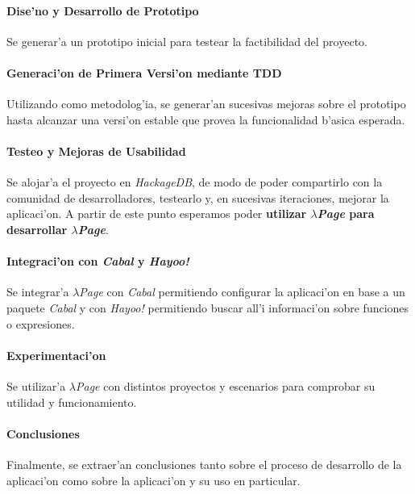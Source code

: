 \documentclass[a4paper]{article}
\begin{document}
\paragraph{Dise'no y Desarrollo de Prototipo} Se generar'a un prototipo inicial para testear la factibilidad del proyecto.
\paragraph{Generaci'on de Primera Versi'on mediante TDD} Utilizando  como metodolog'ia, se generar'an sucesivas mejoras sobre el prototipo hasta alcanzar una versi'on estable que provea la funcionalidad b'asica esperada.
\paragraph{Testeo y Mejoras de Usabilidad} Se alojar'a el proyecto en \textsl{HackageDB}, de modo de poder compartirlo con la comunidad de desarrolladores, testearlo y, en sucesivas iteraciones, mejorar la aplicaci'on.  A partir de este punto esperamos poder \textbf{utilizar \textsl{$\lambda$Page} para desarrollar \textsl{$\lambda$Page}}.
\paragraph{Integraci'on con \textsl{Cabal} y \textsl{Hayoo!}} Se integrar'a \textsl{$\lambda$Page} con \textsl{Cabal} permitiendo configurar la aplicaci'on en base a un paquete \textsl{Cabal} y con \textsl{Hayoo!} permitiendo buscar all'i informaci'on sobre funciones o expresiones.
\paragraph{Experimentaci'on} Se utilizar'a \textsl{$\lambda$Page} con distintos proyectos y escenarios para comprobar su utilidad y funcionamiento.
\paragraph{Conclusiones} Finalmente, se extraer'an conclusiones tanto sobre el proceso de desarrollo de la aplicaci'on como sobre la aplicaci'on y su uso en particular.
\end{document}
